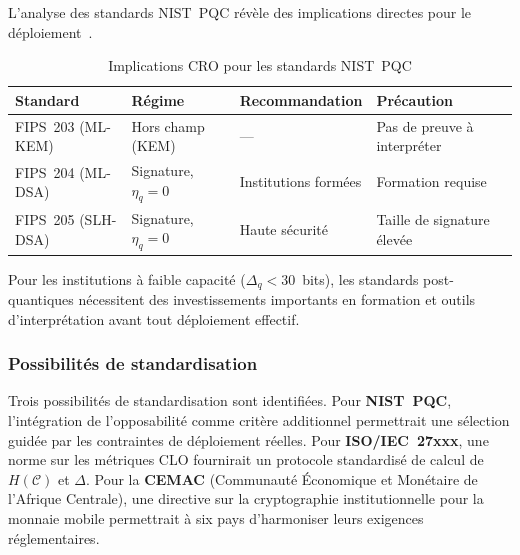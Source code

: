 \begin{sloppypar}
L'analyse des standards NIST~PQC r\'ev\`ele des implications directes
pour le d\'eploiement~\cite{NIST.FIPS.203,NIST.FIPS.204,NIST.FIPS.205,Alagic2022}.

\begin{table}[htbp]
\centering
\caption{Implications CRO pour les standards NIST~PQC}
\label{tab:implications_nist_pqc}
\begin{tabular}{@{}p{3.2cm}p{2.5cm}p{2.8cm}p{2.8cm}@{}}
\toprule
\textbf{Standard} & \textbf{R\'egime} & \textbf{Recommandation}
  & \textbf{Pr\'ecaution} \\
\midrule
FIPS~203 (ML-KEM) & Hors champ (KEM) & --- & Pas de preuve \`a interpr\'eter~\cite{Kyber2022,Peikert2016} \\
FIPS~204 (ML-DSA) & Signature, $\eta_q = 0$ & Institutions form\'ees
  & Formation requise~\cite{Dilithium2022} \\
FIPS~205 (SLH-DSA) & Signature, $\eta_q = 0$ & Haute s\'ecurit\'e
  & Taille de signature \'elev\'ee~\cite{SPHINCS2022,Bernstein2015} \\
\bottomrule
\end{tabular}
\end{table}

Pour les institutions \`a faible capacit\'e ($\Delta_q < 30$~bits), les
standards post-quantiques n\'ecessitent des investissements importants
en formation et outils d'interpr\'etation avant tout d\'eploiement
effectif.

\subsubsection{Possibilit\'es de standardisation}
\label{subsubsec:opportunites_standardisation}

Trois possibilit\'es de standardisation sont identifi\'ees.
Pour \textbf{NIST~PQC}, l'int\'egration de l'opposabilit\'e comme crit\`ere
additionnel permettrait une s\'election guid\'ee par les contraintes de
d\'eploiement r\'eelles. Pour \textbf{ISO/IEC~27xxx}, une norme sur les
m\'etriques CLO fournirait un protocole standardis\'e de calcul de
$H(\mathcal{C})$ et $\Delta$. Pour la \textbf{CEMAC} (Communaut\'e \'Economique et Mon\'etaire de l'Afrique Centrale), une directive sur la
cryptographie institutionnelle pour la monnaie mobile permettrait \`a six
pays d'harmoniser leurs exigences r\'eglementaires.
\end{sloppypar}

